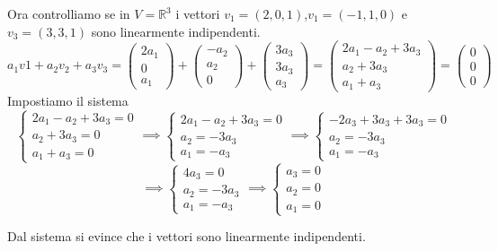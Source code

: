 \documentclass{rapport}
\begin{document}
Ora controlliamo se in $V=\mathbb{R}^3$ i vettori $v_1=(2,0,1)$,$v_1=(-1,1,0)$ e $v_3=(3,3,1)$ sono linearmente indipendenti.
\[
a_1v1+a_2v_2+a_3v_3 = \begin{pmatrix}
2a_1 \\
0 \\
a_1
\end{pmatrix} + \begin{pmatrix}
-a_2 \\
a_2 \\
0
\end{pmatrix} + \begin{pmatrix}
3a_3 \\
3a_3 \\
a_3
\end{pmatrix} =  \begin{pmatrix}
2a_1-a_2+3a_3 \\
a_2+3a_3 \\
a_1+a_3
\end{pmatrix} = \begin{pmatrix}
0 \\
0\\
0
\end{pmatrix}
\]
Impostiamo il sistema
\[
\begin{cases}
  2a_1-a_2+3a_3 = 0 \\
  a_2+3a_3  = 0 \\
  a_1+a_3 = 0
\end{cases} \implies
\begin{cases}
  2a_1-a_2+3a_3 = 0 \\
  a_2  = -3a_3 \\
  a_1= -a_3
\end{cases} \implies
\begin{cases}
  -2a_3+3a_3+3a_3 = 0 \\
  a_2  = -3a_3 \\
  a_1= -a_3
\end{cases}
\]
\[
\implies\begin{cases}
  4a_3 = 0 \\
 a_2  = -3a_3 \\
  a_1= -a_3
\end{cases}
\implies\begin{cases}
  a_3 = 0 \\
  a_2 =0  \\
  a_1 = 0 
\end{cases}
\]

Dal sistema si evince che i vettori sono linearmente indipendenti.
\end{document}
